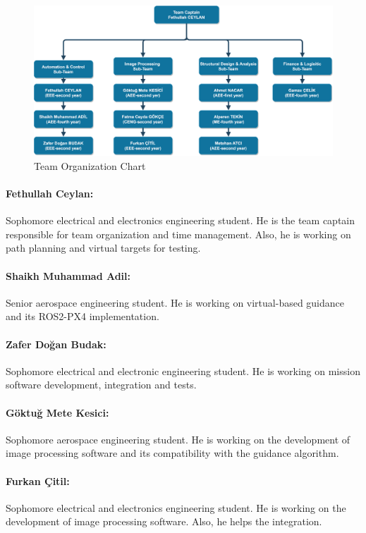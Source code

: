 \documentclass[12pt]{article}
\begin{document}
\begin{figure}[ht]
 	\centering
 	\includegraphics[width =\linewidth]{TeamChart.png}
 	\caption{Team Organization Chart}
        \label{fig:stall}
 \end{figure}
\FloatBarrier


\paragraph*{Fethullah Ceylan:} Sophomore electrical and electronics engineering student. He is the team captain responsible for team organization and time management. Also, he is working on path planning and virtual targets for testing.

\paragraph*{Shaikh Muhammad Adil:} Senior aerospace engineering student. He is working on virtual-based guidance and its ROS2-PX4 implementation.

\paragraph*{Zafer Doğan Budak:} Sophomore electrical and electronic engineering student. He is working on mission software development, integration and tests. 

\paragraph*{Göktuğ Mete Kesici:} Sophomore aerospace engineering student. He is working on the development of image processing software and its compatibility with the guidance algorithm.

\paragraph*{Furkan Çitil:} Sophomore electrical and electronics engineering student. He is working on the development of image processing software. Also, he helps the integration.
\end{document}

